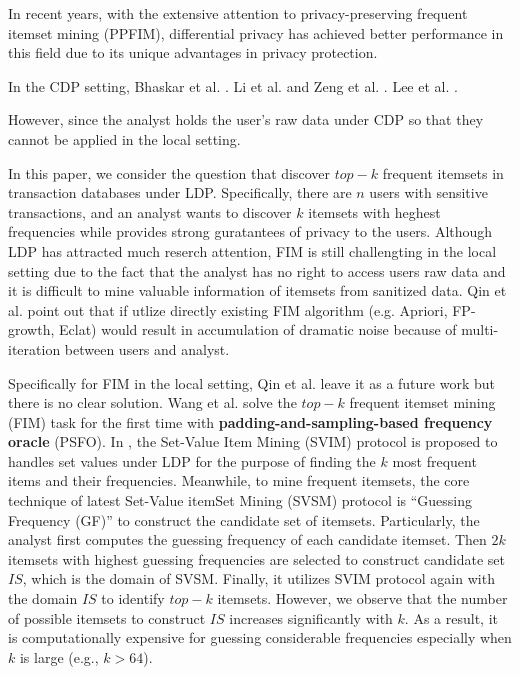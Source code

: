 \documentclass[conference]{IEEEtran}
\begin{document}
In recent years, with the extensive attention to privacy-preserving frequent itemset mining (PPFIM), differential privacy has achieved better performance in this field due to its unique advantages in privacy protection. {\color{red}In the CDP setting, Bhaskar et al.\cite{a3}  . Li et al.\cite{a4} and Zeng et al.\cite{a5} . Lee et al.\cite{a5} .

However, since the analyst holds the user's raw data under CDP so that they cannot be applied in the local setting.
} 

In this paper, we consider the question that discover $top-k$ frequent itemsets in transaction databases under LDP. Specifically, there are $n$ users with sensitive transactions, and an analyst wants to discover $k$ itemsets with heghest frequencies while provides strong guratantees of privacy to the users. Although LDP has attracted much reserch attention\cite{a1,a2,a8,privtrie,privkv,b1,b2,b3,b4,b5}, FIM is still challengting in the local setting due to the fact that the analyst has no right to access users raw data and it is difficult to mine valuable information of itemsets from sanitized data. Qin et al.\cite{a1} point out that if utlize directly existing FIM algorithm (e.g. Apriori\cite{apriori,apr}, FP-growth\cite{fp}, Eclat\cite{eclat}) would result in accumulation of dramatic noise because of multi-iteration between users and analyst.

Specifically for FIM in the local setting, Qin et al.\cite{a1} leave it as a future work but there is no clear solution. Wang et al.\cite{a2} solve the $top-k$ frequent itemset mining (FIM) task for the first time with \textbf{padding-and-sampling-based frequency oracle} (PSFO). In \cite{a2}, the Set-Value Item Mining (SVIM) protocol is proposed to handles set values under LDP for the purpose of finding the $k$ most frequent items and their frequencies. Meanwhile, to mine frequent itemsets, the core technique of latest Set-Value itemSet Mining (SVSM) protocol is ``Guessing Frequency (GF)'' to construct the candidate set of itemsets. Particularly, the analyst first computes the guessing frequency of each candidate itemset. Then $2k$ itemsets with highest guessing frequencies are selected to construct candidate set $IS$, which is the domain of SVSM. Finally, it utilizes SVIM protocol again with the domain $IS$ to identify $top-k$ itemsets. However, we observe that the number of possible itemsets to construct $IS$ increases significantly with $k$. As a result, it is computationally expensive for guessing considerable frequencies especially when $k$ is large (e.g., $k > 64$). 
\end{document}

